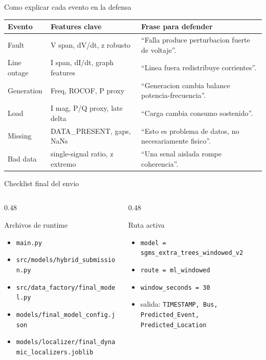 \documentclass[10pt,aspectratio=169]{beamer}
\newcommand{\code}[1]{\texttt{\footnotesize #1}}
\begin{document}
\begin{frame}{Como explicar cada evento en la defensa}
\small
\centering
\begin{tabular}{p{}p{}p{}}
\toprule
\textbf{Evento} & \textbf{Features clave} & \textbf{Frase para defender}\\
\midrule
Fault & V span, dV/dt, z robusto & ``Falla produce perturbacion fuerte de voltaje''.\\
Line outage & I span, dI/dt, graph features & ``Linea fuera redistribuye corrientes''.\\
Generation & Freq, ROCOF, P proxy & ``Generacion cambia balance potencia-frecuencia''.\\
Load & I mag, P/Q proxy, late delta & ``Carga cambia consumo sostenido''.\\
Missing & DATA\_PRESENT, gaps, NaNs & ``Esto es problema de datos, no necesariamente fisico''.\\
Bad data & single-signal ratio, z extremo & ``Una senal aislada rompe coherencia''.\\
\bottomrule
\end{tabular}
\end{frame}

\begin{frame}{Checklist final del envio}
\small
\begin{columns}[T,totalwidth=\textwidth]
\begin{column}{0.48\textwidth}
\begin{block}{Archivos de runtime}
\begin{itemize}
  \item \code{main.py}
  \item \code{src/models/hybrid\_submission.py}
  \item \code{src/data\_factory/final\_model.py}
  \item \code{models/final\_model\_config.json}
  \item \code{models/localizer/final\_dynamic\_localizers.joblib}
\end{itemize}
\end{block}
\end{column}
\begin{column}{0.48\textwidth}
\begin{alertblock}{Ruta activa}
\begin{itemize}
  \item \code{model = sgms\_extra\_trees\_windowed\_v2}
  \item \code{route = ml\_windowed}
  \item \code{window\_seconds = 30}
  \item salida: \code{TIMESTAMP, Bus, Predicted\_Event, Predicted\_Location}
\end{itemize}
\end{alertblock}
\end{column}
\end{columns}
\end{frame}
\end{document}
